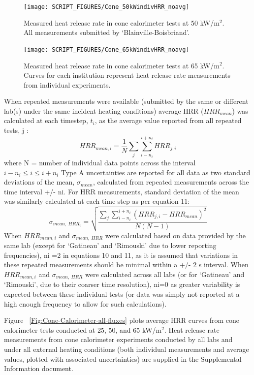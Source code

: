 \documentclass{book}
\begin{document}
\begin{figure}
  \centering
  \texttt{[image: SCRIPT\_FIGURES/Cone\_50kWindivHRR\_noavg]}
  \caption{Measured heat release rate in cone calorimeter tests at 50 kW/m$^2$. All measurements submitted by ‘Blainville-Boisbriand’.}
  \label{Fig:Cone_50kWindivHRR}
\end{figure}

\begin{figure}
  \centering
  \texttt{[image: SCRIPT\_FIGURES/Cone\_65kWindivHRR\_noavg]}
  \caption{Measured heat release rate in cone calorimeter tests at 65 kW/m$^2$. Curves for each institution represent heat release rate measurements from individual experiments.}
  \label{Fig:Cone_65kWindivHRR}
\end{figure}

When repeated measurements were available (submitted by the same or different lab(s) under the same incident heating conditions) average HRR ($HRR_{mean}$) was calculated at each timestep, $t_i$, as the average value reported from all repeated tests, j :
\begin{equation}
  HRR_{mean,i}=\frac{1}{N}\sum_{j}\sum_{i-n_i}^{i+n_i}{HRR_{j,i}}
\end{equation}
where N = number of individual data points across the interval $i-n_i\le i\le i+n_i$
Type A uncertainties are reported for all data as two standard deviations of the mean, $\sigma_{mean}$, calculated from repeated measurements across the time interval +/- ni. For HRR measurements, standard deviation of the mean was similarly calculated at each time step as per equation 11:
\begin{equation}
   \sigma_{mean,\ HRR_i}=\sqrt{\frac{\sum_{j}\sum_{i-n_i}^{i+n_i}\left(HRR_{j,i}-HRR_{mean}\right)^2}{N\left(N-1\right)}}
\end{equation}
When $HRR_{mean,i}$ and $\sigma_{mean,\ HRR}$ were calculated based on data provided by the same lab (except for ‘Gatineau’ and ‘Rimouski’ due to lower reporting frequencies), ni =2 in equations 10 and 11, as it is assumed that variations in these repeated measurements should be minimal within a +/- 2 s interval. When $HRR_{mean,i}$ and $\sigma_{mean,\ HRR}$ were calculated across all labs (or for ‘Gatineau’ and ‘Rimouski’, due to their coarser time resolution), ni=0 as greater variability is expected between these individual tests (or data was simply not reported at a high enough frequency to allow for such calculations).


Figure ~\ref{Fig:Cone-Calorimeter-all-fluxes} plots average HRR curves from cone calorimeter tests conducted at 25, 50, and 65 kW/m$^2$. Heat release rate measurements from cone calorimeter experiments conducted by all labs and under all external heating conditions (both individual measurements and average values, plotted with associated uncertainties) are supplied in the Supplemental Information document.
\end{document}
